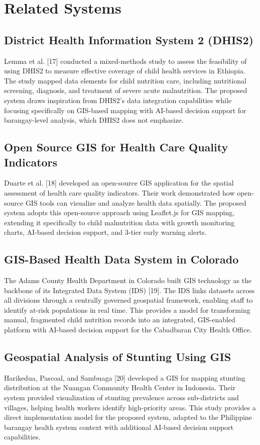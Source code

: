 \documentclass[12pt, a4paper]{report}
\begin{document}
\section{Related Systems}
\label{sec:related_sys}

\subsection{District Health Information System 2 (DHIS2)}
Lemma et al. [17] conducted a mixed-methods study to assess the feasibility of using DHIS2 to measure effective coverage of child health services in Ethiopia. The study mapped data elements for child nutrition care, including nutritional screening, diagnosis, and treatment of severe acute malnutrition. The proposed system draws inspiration from DHIS2's data integration capabilities while focusing specifically on GIS-based mapping with AI-based decision support for barangay-level analysis, which DHIS2 does not emphasize.

\subsection{Open Source GIS for Health Care Quality Indicators}
Duarte et al. [18] developed an open-source GIS application for the spatial assessment of health care quality indicators. Their work demonstrated how open-source GIS tools can visualize and analyze health data spatially. The proposed system adopts this open-source approach using Leaflet.js for GIS mapping, extending it specifically to child malnutrition data with growth monitoring charts, AI-based decision support, and 3-tier early warning alerts.

\subsection{GIS-Based Health Data System in Colorado}
The Adams County Health Department in Colorado built GIS technology as the backbone of its Integrated Data System (IDS) [19]. The IDS links datasets across all divisions through a centrally governed geospatial framework, enabling staff to identify at-risk populations in real time. This provides a model for transforming manual, fragmented child nutrition records into an integrated, GIS-enabled platform with AI-based decision support for the Cabadbaran City Health Office.

\subsection{Geospatial Analysis of Stunting Using GIS}
Harikedua, Pascoal, and Sambuaga [20] developed a GIS for mapping stunting distribution at the Nuangan Community Health Center in Indonesia. Their system provided visualization of stunting prevalence across sub-districts and villages, helping health workers identify high-priority areas. This study provides a direct implementation model for the proposed system, adapted to the Philippine barangay health system context with additional AI-based decision support capabilities.
\end{document}
